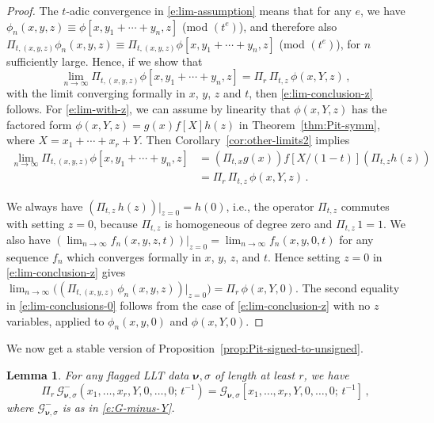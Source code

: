 \documentclass[12pt]{amsart}
\newtheorem{lemma}[thm]{Lemma}
\theoremstyle{definition}
\theoremstyle{remark}
\newcommand{\nubold}{{\boldsymbol \nu }}
\newcommand{\Gcal}{{\mathcal G}}
\newcommand{\Pisf}{{\mathsf \Pi }}
\begin{document}
\begin{proof}
The $t$-adic convergence in \eqref{e:lim-assumption} means that for
any $e$, we have $\phi _{n}(x,y,z) \equiv \phi [x,y_{1}+\cdots
+y_{n},z]$ (mod $(t^{e})$), and therefore also $\Pi _{t,(x,y,z)}\phi
_{n}(x,y,z) \equiv \Pi _{t,(x,y,z)}\phi [x,y_{1}+\cdots +y_{n},z]$
(mod $(t^{e})$), for $n$ sufficiently large.  Hence, if we show that
\begin{equation}\label{e:lim-with-z}
\lim_{n\rightarrow \infty } \Pi _{t,(x,y,z)}\phi [x,y_{1}+\cdots
+y_{n},z] = \Pisf _{r} \, \Pi _{t,z}\, \phi (x,Y,z)\, ,
\end{equation}
with the limit converging formally in $x$, $y$, $z$ and $t$, then
\eqref{e:lim-conclusion-z} follows.  For \eqref{e:lim-with-z}, we can
assume by linearity that $\phi (x,Y,z)$ has the factored form $\phi
(x,Y,z) = g(x)f[X]h(z)$ in Theorem~\ref{thm:Pit-symm}, where $X=
x_{1}+\cdots +x_{r}+Y$.
Then Corollary~\ref{cor:other-limits2} implies
\begin{equation}\label{e:lim-with-z-2}
\begin{aligned}
\lim_{n\rightarrow \infty } \Pi _{t,(x,y,z)}\phi [x,y_{1}+\cdots
+y_{n},z] & = (\Pi _{t,x} g(x))f[X/(1-t)] (\Pi _{t,z} h(z)) \\
& = \Pisf _{r} \, \Pi _{t,z}\, \phi (x,Y,z)\, .
\end{aligned}
\end{equation}

We always have $(\Pi _{t,z}\, h(z))|_{z=0} = h(0)$, i.e., the operator
$\Pi _{t,z}$ commutes with setting $z=0$, because $\Pi _{t,z}$ is
homogeneous of degree zero and $\Pi _{t,z}\, 1 = 1$. We also have
$(\lim_{n\to\infty} f_n(x,y,z,t))|_{z=0} = \lim_{n\to\infty}
f_n(x,y,0,t)$ for any sequence $f_n$ which converges formally in $x$,
$y$, $z$, and $t$.  Hence setting $z=0$ in \eqref{e:lim-conclusion-z}
gives $\lim_{n\rightarrow \infty } \bigl((\Pi _{t,(x,y,z)}\, \phi
_{n}(x,y,z))|_{z = 0}\bigr) = \Pisf _{r}\, \phi (x,Y,0).$ The second
equality in \eqref{e:lim-conclusions-0} follows from the case of
\eqref{e:lim-conclusion-z} with no $z$ variables, applied to
$\phi_{n}(x,y,0)$ and $\phi (x,Y,0)$.
\end{proof}

We now get a stable version of
Proposition~\ref{prop:Pit-signed-to-unsigned}.

\begin{lemma}\label{lem:Pir-signed-to-unsigned}
For any flagged LLT data $\nubold , \sigma $ of length at least $r$,
we have
\begin{equation}\label{e:Pir-signed-to-unsigned}
\Pisf _{r}\, \Gcal ^{-} _{\nubold ,\sigma
}(x_{1},\ldots,x_{r},Y,0,\ldots,0;\, t^{-1}) = \Gcal _{\nubold ,\sigma
}[x_{1},\ldots,x_{r},Y,0,\ldots,0;\, t^{-1}]\, ,
\end{equation}
where $ \Gcal ^{-} _{\nubold ,\sigma}$ is as in \eqref{e:G-minus-Y}.
\end{lemma}
\end{document}
